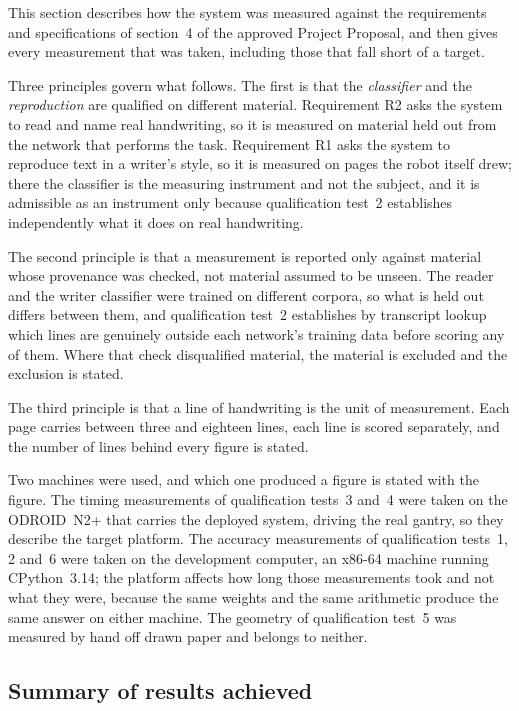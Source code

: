 \label{sec:results}

This section describes how the system was measured against the requirements
and specifications of section~4 of the approved Project Proposal, and then
gives every measurement that was taken, including those that fall short of a
target.

Three principles govern what follows. The first is that the \emph{classifier}
and the \emph{reproduction} are qualified on different material. Requirement
R2 asks the system to read and name real handwriting, so it is measured on
material held out from the network that performs the task. Requirement R1 asks
the system to reproduce text in a writer's style, so it is measured on pages the
robot itself drew; there the classifier is the measuring instrument and not the
subject, and it is admissible as an instrument only because qualification
test~2 establishes independently what it does on real handwriting.

The second principle is that a measurement is reported only against material
whose provenance was checked, not material assumed to be unseen. The reader and
the writer classifier were trained on different corpora, so what is held out
differs between them, and qualification test~2 establishes by transcript lookup
which lines are genuinely outside each network's training data before scoring
any of them. Where that check disqualified material, the material is excluded
and the exclusion is stated.

The third principle is that a line of handwriting is the unit of measurement.
Each page carries between three and eighteen lines, each line is scored
separately, and the number of lines behind every figure is stated.

Two machines were used, and which one produced a figure is stated with the
figure. The timing measurements of qualification tests~3 and~4 were taken on
the ODROID~N2+ that carries the deployed system, driving the real gantry, so
they describe the target platform. The accuracy measurements of qualification
tests~1, 2 and~6 were taken on the development computer, an x86-64 machine
running CPython~3.14; the platform affects how long those measurements took and
not what they were, because the same weights and the same arithmetic produce
the same answer on either machine. The geometry of qualification test~5 was
measured by hand off drawn paper and belongs to neither.

\subsection{Summary of results achieved} %
\label{sec:res-summary}


